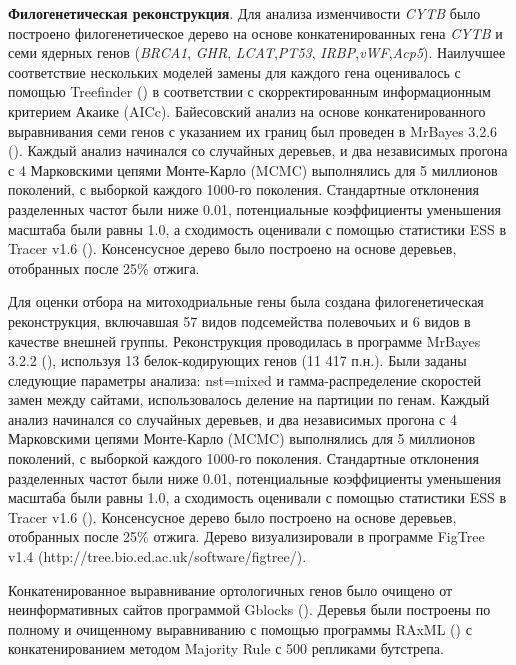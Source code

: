 \textbf{Филогенетическая реконструкция}. Для анализа изменчивости \textit{CYTB} было построено филогенетическое дерево на основе конкатенированных гена \textit{CYTB} и семи ядерных генов (\textit{BRCA1}, \textit{GHR}, \textit{LCAT},\textit{PT53}, \textit{IRBP},\textit{vWF},\textit{Acp5}). Наилучшее соответствие нескольких моделей замены для каждого гена оценивалось с помощью Treefinder (\cite{Jobb2004}) в соответствии с скорректированным информационным критерием Акаике (AICc). Байесовский анализ на основе конкатенированного выравнивания семи генов с указанием их границ был проведен в MrBayes 3.2.6 (\cite{Ronquist2012}). Каждый анализ начинался со случайных деревьев, и два независимых прогона с 4 Марковскими цепями Монте-Карло (MCMC) выполнялись для 5 миллионов поколений, с выборкой каждого 1000-го поколения. Стандартные отклонения разделенных частот были ниже 0.01, потенциальные коэффициенты уменьшения масштаба были равны 1.0, а сходимость оценивали с помощью статистики ESS в Tracer v1.6 (\cite{Rambaut2014}). Консенсусное дерево было построено на основе деревьев, отобранных после 25\% отжига.

Для оценки отбора на митоходриальные гены была создана филогенетическая реконструкция, включавшая 57 видов подсемейства полевочьих и 6 видов в качестве внешней группы. Реконструкция проводилась в программе MrBayes 3.2.2 (\cite{Ronquist2012}), используя 13 белок-кодирующих генов (11 417 п.н.). Были заданы следующие параметры анализа: nst=mixed и гамма-распределение скоростей замен между сайтами, использовалось деление на партиции по генам. Каждый анализ начинался со случайных деревьев, и два независимых прогона с 4 Марковскими цепями Монте-Карло (MCMC) выполнялись для 5 миллионов поколений, с выборкой каждого 1000-го поколения. Стандартные отклонения разделенных частот были ниже 0.01, потенциальные коэффициенты уменьшения масштаба были равны 1.0, а сходимость оценивали с помощью статистики ESS в Tracer v1.6 (\cite{Rambaut2014}). Консенсусное дерево было построено на основе деревьев, отобранных после 25\% отжига. Дерево визуализировали в программе FigTree v1.4 (http://tree.bio.ed.ac.uk/software/figtree/).

Конкатенированное выравнивание ортологичных генов было очищено от неинформативных сайтов программой Gblocks (\cite{Castresana2000}). Деревья были построены по полному и очищенному выравниванию с помощью программы RAxML (\cite{Stamatakis2014}) с конкатенированием методом Majority Rule с 500 репликами бутстрепа. 

